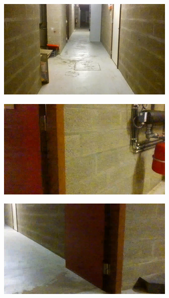 \begin{figure}[H]
\begin{subfigure}{0.32\textwidth}
        \vspace{0.5em}
    \end{subfigure}
    \hfill
    \begin{subfigure}{0.32\textwidth}
        \centering
        \includegraphics[width=\textwidth]{resources/png/07/classification/datasets/2.png}
        \vspace{0.5em}
    \end{subfigure}
    \begin{subfigure}{0.32\textwidth}
        \centering
        \includegraphics[width=\textwidth]{resources/png/07/classification/datasets/3.png}
    \end{subfigure}
    \hfill
    \begin{subfigure}{0.32\textwidth}
        \centering
        \includegraphics[width=\textwidth]{resources/png/07/classification/datasets/4.png}

\end{subfigure}
\end{figure}

